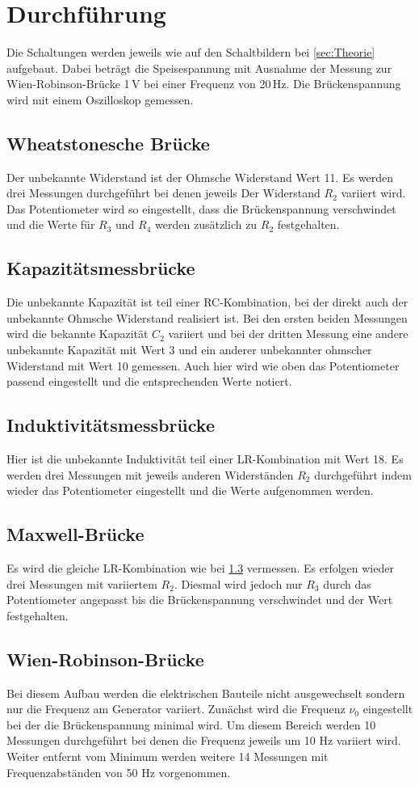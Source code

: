 \section{Durchführung}
\label{sec:Durchführung}

Die Schaltungen werden jeweils wie auf den Schaltbildern bei 
\ref{sec:Theorie} aufgebaut. Dabei beträgt die
Speisespannung mit Ausnahme der Messung
zur Wien-Robinson-Brücke 1\,V bei einer Frequenz von 20\,Hz. Die Brückenspannung wird
mit einem Oszilloskop gemessen.
\subsection{Wheatstonesche Brücke}
Der unbekannte Widerstand ist der Ohmsche Widerstand Wert 11.
Es werden drei Messungen durchgeführt bei denen jeweils Der Widerstand $R_2$
variiert wird. Das Potentiometer wird so eingestellt,
dass die Brückenspannung verschwindet und die Werte
für $R_3$ und $R_4$ werden zusätzlich zu $R_2$ festgehalten.
\subsection{Kapazitätsmessbrücke}
Die unbekannte Kapazität ist teil einer RC-Kombination,
bei der direkt auch der unbekannte Ohmsche Widerstand realisiert ist.
Bei den ersten beiden Messungen wird die bekannte Kapazität $C_2$ variiert
und bei der dritten Messung eine andere unbekannte Kapazität mit Wert 3
und ein anderer unbekannter ohmscher Widerstand mit Wert 10 gemessen.
Auch hier wird wie oben das Potentiometer passend eingestellt und die
entsprechenden Werte notiert.
\subsection{Induktivitätsmessbrücke}
\label{sec:Indu}
Hier ist die unbekannte Induktivität teil einer LR-Kombination
mit Wert 18. Es werden drei Messungen mit jeweils anderen Widerständen $R_2$
durchgeführt indem wieder das Potentiometer eingestellt und die Werte aufgenommen werden.
\subsection{Maxwell-Brücke}
Es wird die gleiche LR-Kombination wie bei \ref{sec:Indu} vermessen.
Es erfolgen wieder drei Messungen mit variiertem $R_2$. Diesmal
wird jedoch nur $R_3$ durch das Potentiometer angepasst bis die
Brückenspannung verschwindet und der Wert festgehalten.

\subsection{Wien-Robinson-Brücke}
Bei diesem Aufbau werden die elektrischen Bauteile
nicht ausgewechselt sondern nur die Frequenz am 
Generator variiert. Zunächst wird die Frequenz $\nu_0$ eingestellt
bei der die Brückenspannung minimal wird. Um diesem Bereich werden
10 Messungen durchgeführt bei denen die Frequenz jeweils um 10 Hz
variiert wird. Weiter entfernt vom Minimum werden weitere 14 Messungen
mit Frequenzabständen von 50 Hz vorgenommen.

